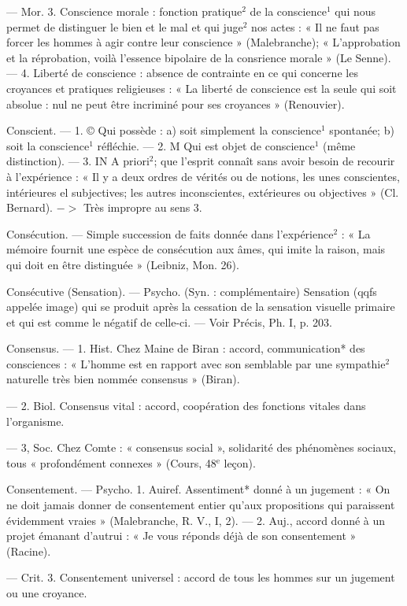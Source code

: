 — Mor. 3. Conscience morale :
fonction pratique$^2$ de la conscience$^1$
qui nous permet de distinguer le
bien et le mal et qui juge$^2$ nos actes :
« Il ne faut pas forcer les hommes à
agir contre leur conscience » (Malebranche); « L’approbation et la
réprobation, voilà l'essence bipolaire de la consrience morale » (Le
Senne). — 4. Liberté de conscience :
absence de contrainte en ce qui
concerne les croyances et pratiques
religieuses : « La liberté de conscience
est la seule qui soit absolue : nul ne
peut être incriminé pour ses croyances » (Renouvier).

Conscient. — 1. © Qui possède : a) soit
simplement la conscience$^1$ spontanée; b) soit la conscience$^1$ réfléchie.
— 2. M Qui est objet de conscience$^1$
(même distinction). — 3. IN A priori$^2$;
que l'esprit connaît sans avoir besoin
de recourir à l’expérience : « Il y a
deux ordres de vérités ou de notions,
les unes conscientes, intérieures el
subjectives; les autres inconscientes,
extérieures ou objectives » (Cl. Bernard). $->$ Très impropre au
sens 3.

Consécution. — Simple succession de
faits donnée dans l'expérience$^2$ :
« La mémoire fournit une espèce de
consécution aux âmes, qui imite la
raison, mais qui doit en être distinguée » (Leibniz, Mon. 26).

Consécutive (Sensation). — Psycho.
(Syn. : complémentaire) Sensation
(qqfs appelée image) qui se produit
après la cessation de la sensation
visuelle primaire et qui est comme
le négatif de celle-ci. — Voir Précis,
Ph. I, p. 203.

Consensus. — 1. Hist. Chez Maine de
Biran : accord, communication*
des consciences : « L'homme est en
rapport avec son semblable par une
sympathie$^2$ naturelle très bien
nommée consensus » (Biran).

— 2. Biol. Consensus vital : accord, coopération des fonctions vitales dans l'organisme.

— 3, Soc. Chez Comte : « consensus
social », solidarité des phénomènes
sociaux, tous « profondément connexes » (Cours, 48$^\text{e}$ leçon).

Consentement. — Psycho. 1. Auiref.
Assentiment* donné à un jugement : « On ne doit jamais donner de
consentement entier qu'aux propositions qui paraissent évidemment
vraies » (Malebranche, R. V., I, 2). —
2. Auj., accord donné à un projet
émanant d'autrui : « Je vous réponds
déjà de son consentement » (Racine).

— Crit. 3. Consentement universel : accord de tous les hommes
sur un jugement ou une croyance.

